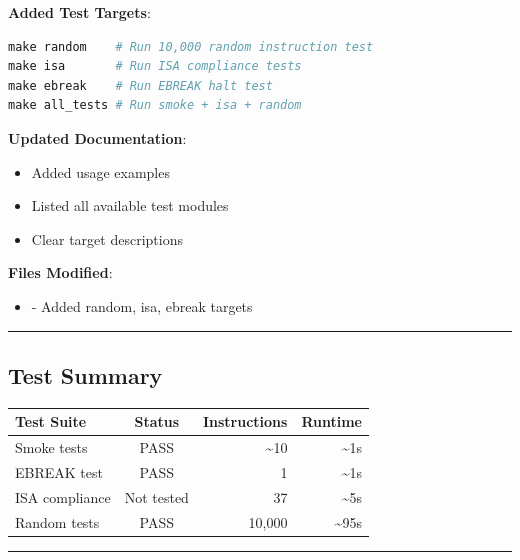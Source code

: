 \begin{record}

\textbf{Added Test Targets}:

\begin{lstlisting}[language=make]
make random    # Run 10,000 random instruction test
make isa       # Run ISA compliance tests
make ebreak    # Run EBREAK halt test
make all_tests # Run smoke + isa + random
\end{lstlisting}

\textbf{Updated Documentation}:

\begin{itemize}
\tightlist
\item
  Added usage examples
\item
  Listed all available test modules
\item
  Clear target descriptions
\end{itemize}

\textbf{Files Modified}:

\begin{itemize}
\tightlist
\item
   - Added random, isa, ebreak targets
\end{itemize}

\begin{center}\rule{0.5\linewidth}{0.5pt}\end{center}

\end{record}

\subsection{Test Summary}\label{cr:app:archive-session-summary:test-summary}

\begin{record}

{
\begin{longtable}[]{@{}lcrr@{}}
\toprule\noalign{}
Test Suite & Status & Instructions & Runtime \\
\midrule\noalign{}
\endhead
\bottomrule\noalign{}
\endlastfoot
Smoke tests & \ok{} PASS & \textasciitilde10 & \textasciitilde1s \\
EBREAK test & \ok{} PASS & 1 & \textasciitilde1s \\
ISA compliance & \openmark{} Not tested & 37 & \textasciitilde5s \\
Random tests & \ok{} PASS & 10,000 & \textasciitilde95s \\
\end{longtable}
}

\begin{center}\rule{0.5\linewidth}{0.5pt}\end{center}

\end{record}

